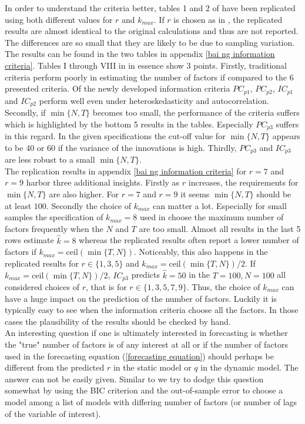 \documentclass[12pt]{article}
\begin{document}
In order to understand the criteria better, tables 1 and 2 of \citet{bai2002determining} have been replicated using both different values for $r$ and $k_{max}$. If $r$ is chosen as in \citet{bai2002determining}, the replicated results are almost identical to the original calculations and thus are not reported. The differences are so small that they are likely to be due to sampling variation. The results can be found in the two tables in appendix \ref{bai ng information criteria}. Tables I through VIII in \citet{bai2002determining} in essence show $3$ points. Firstly, traditional criteria perform poorly in estimating the number of factors if compared to the $6$ presented criteria. Of the newly developed information criteria $PC_{p1}$, $PC_{p2}$, $IC_{p1}$ and $IC_{p2}$ perform well even under heteroskedasticity and autocorrelation. Secondly, if $\min\{N, T\}$ becomes too small, the performance of the criteria suffers which is highlighted by the bottom 5 results in the tables. Especially $PC_{p3}$ suffers in this regard. In the given specifications the cut-off value for $\min\{N, T\}$ appears to be 40 or 60 if the variance of the innovations is high. Thirdly, $PC_{p3}$ and $IC_{p3}$ are less robust to a small $\min\{N, T\}$. \\
The replication results in appendix \ref{bai ng information criteria} for $r=7$ and $r=9$ harbor three additional insights. Firstly as $r$ increases, the requirements for $\min\{N, T\}$ are also higher. For $r=7$ and $r=9$ it seems $\min\{N, T\}$ should be at least $100$. Secondly the choice of $k_{max}$ can matter a lot. Especially for small samples the specification of $k_{max}=8$ used in \citet{bai2002determining} choose the maximum number of factors frequently when the $N$ and $T$ are too small. Almost all results in the last 5 rows estimate $\hat k=8$ whereas the replicated results often report a lower number of factors if $k_{max}=\text{ceil}(\min\{T, N\})$. Noticeably, this also happens in the replicated results for $r \in \{1, 3, 5\}$ and $k_{max}=\text{ceil}(\min\{T, N\})/2$. If $k_{max}=\text{ceil}(\min\{T, N\})/2$, $IC_{p3}$ predicts $\hat k=50$ in the $T=100, N=100$ all considered choices of $r$, that is for $r \in \{1, 3, 5, 7, 9\}$. Thus, the choice of $k_{max}$ can have a huge impact on the prediction of the number of factors. Luckily it is typically easy to see when the information criteria choose all the factors. In those cases the plausibility of the results should be checked by hand. \\

An interesting question if one is ultimately interested in forecasting is whether the "true" number of factors is of any interest at all or if the number of factors used in the forecasting equation (\ref{forecasting equation}) should perhaps be different from the predicted $r$ in the static model or $q$ in the dynamic model. The answer can not be easily given. Similar to \citet{bai2008forecasting} we try to dodge this question somewhat by using the BIC criterion and the out-of-sample error to choose a model among a list of models with differing number of factors (or number of lags of the variable of interest).
\end{document}
